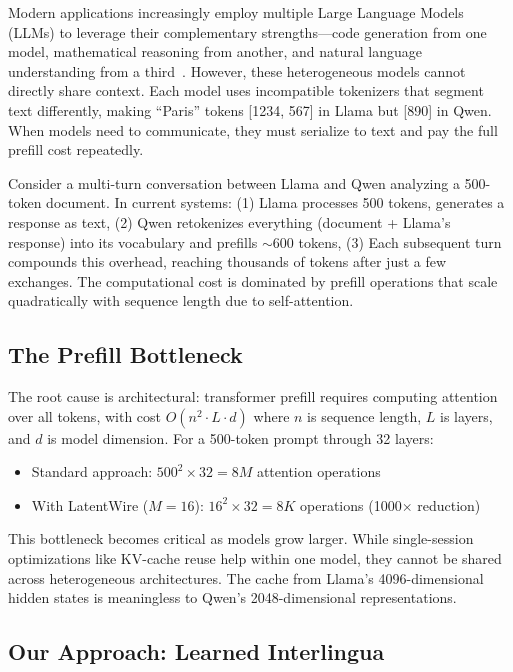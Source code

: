 \documentclass{article}
\begin{document}
Modern applications increasingly employ multiple Large Language Models (LLMs) to leverage their complementary strengths—code generation from one model, mathematical reasoning from another, and natural language understanding from a third~\cite{anthropic2024multiagent,openai2024multiagent}. However, these heterogeneous models cannot directly share context. Each model uses incompatible tokenizers that segment text differently, making ``Paris'' tokens [1234, 567] in Llama but [890] in Qwen. When models need to communicate, they must serialize to text and pay the full prefill cost repeatedly.

Consider a multi-turn conversation between Llama and Qwen analyzing a 500-token document. In current systems: (1) Llama processes 500 tokens, generates a response as text, (2) Qwen retokenizes everything (document + Llama's response) into its vocabulary and prefills $\sim$600 tokens, (3) Each subsequent turn compounds this overhead, reaching thousands of tokens after just a few exchanges. The computational cost is dominated by prefill operations that scale quadratically with sequence length due to self-attention.

\subsection{The Prefill Bottleneck}

The root cause is architectural: transformer prefill requires computing attention over all tokens, with cost $O(n^2 \cdot L \cdot d)$ where $n$ is sequence length, $L$ is layers, and $d$ is model dimension. For a 500-token prompt through 32 layers:
\begin{itemize}
\item Standard approach: $500^2 \times 32 = 8M$ attention operations
\item With LatentWire ($M=16$): $16^2 \times 32 = 8K$ operations (1000$\times$ reduction)
\end{itemize}

This bottleneck becomes critical as models grow larger. While single-session optimizations like KV-cache reuse help within one model, they cannot be shared across heterogeneous architectures. The cache from Llama's 4096-dimensional hidden states is meaningless to Qwen's 2048-dimensional representations.

\subsection{Our Approach: Learned Interlingua}
\end{document}
